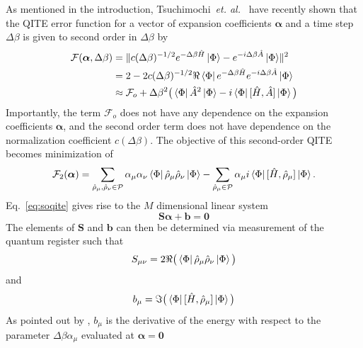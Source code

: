 \documentclass[aip,jcp,amsmath,amssymb, reprint]{revtex4-1}
\providecommand{\norm}[1]{\lVert#1\rVert}
\begin{document}
As mentioned in the introduction, Tsuchimochi~\textit{et. al.}~\cite{Tsuchimochi2023Improved} have recently shown that the QITE error function for a vector of expansion coefficients $\boldsymbol{\alpha}$ and a time step $\Delta \beta$ is given to second order in $\Delta \beta$ by
\begin{equation}
\begin{aligned}
\mathcal{F}(\boldsymbol{\alpha}, \Delta \beta) &= \norm{  c(\Delta \beta)^{-1/2} e^{-\Delta \beta \hat{H} }\ket{\Phi} -  e^{-i \Delta \beta \hat{A}}\ket{\Phi}  }^2 \\
&= 2 - 2 c(\Delta \beta)^{-1/2} \Re \bra{\Phi} e^{-\Delta \beta \hat{H} } e^{-i \Delta \beta \hat{A}} \ket{\Phi} \\
&\approx \mathcal{F}_o + \Delta \beta^2 \big( \bra{\Phi} \hat{A}^2 \ket{\Phi}  - i  \bra{\Phi} [ \hat{H}, \hat{A} ] \ket{\Phi}  \big)
\end{aligned}
\end{equation}
Importantly, the term $\mathcal{F}_o$ does not have any dependence on the expansion coefficients $\boldsymbol{\alpha}$, 
and the second order term does not have dependence on the normalization coefficient $c(\Delta \beta)$.
The objective of this second-order QITE becomes minimization of 
\begin{equation}
\mathcal{F}_2(\boldsymbol{\alpha}) 
= \sum_{\hat{ \rho}_\mu, \hat{ \rho}_\nu \in \mathcal{P}} \alpha_\mu \alpha_\nu \bra{\Phi}  \hat{\rho}_\mu  \hat{\rho}_\nu \ket{\Phi}
- \sum_{\hat{ \rho}_\mu \in \mathcal{P}} \alpha_\mu i \bra{\Phi} [ \hat{H}, \hat{\rho}_\mu ] \ket{\Phi}. 
\label{eq:soqite}
\end{equation}
Eq.~\eqref{eq:soqite} gives rise to the $M$ dimensional linear system 
\begin{equation}
\label{eq:lin_sys}
\mathbf{S}\boldsymbol{\alpha} +\mathbf{b} = \mathbf{0}
\end{equation}
The elements of $\mathbf{S}$ and $\mathbf{b}$ can then be determined via measurement of the quantum register such that   
\begin{equation}
S_{\mu \nu} = 2 \Re \big( \bra{\Phi} \hat{\rho}_\mu \hat{\rho}_\nu \ket{\Phi} \big)
\end{equation}
and
\begin{equation}
b_{\mu} = \Im \big( \bra{\Phi}  [ \hat{H}, \hat{\rho}_\mu ]  \ket{\Phi} \big)
\end{equation}
As pointed out by , $b_\mu$ is the derivative of the energy with respect to the parameter $\Delta \beta \alpha_\mu$ evaluated at $\boldsymbol{\alpha} = \mathbf{0}$
\end{document}
